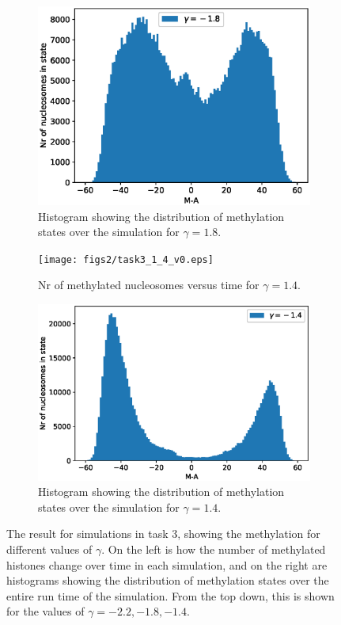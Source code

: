 \documentclass[fleqn,10pt]{SelfArx} %
\begin{document}
\begin{figure}[ht!]
\begin{subfigure}[b]{.49\textwidth}
		\includegraphics[width= \linewidth]{figs2/task3_hist_1_8_v0.eps}
		\caption{Histogram showing the distribution of methylation states over the simulation for $\gamma=1.8$.}
		\label{fig:task3_hist_1_8}
	\end{subfigure}
	\begin{subfigure}[b]{.49\textwidth}
		\centering
		\texttt{[image: figs2/task3\_1\_4\_v0.eps]}
		\caption{Nr of methylated nucleosomes versus time for $\gamma=1.4$.}
		\label{fig:task3_m_vs_t_1_4}
	\end{subfigure}
	\begin{subfigure}[b]{.49\textwidth}
		\centering
		\includegraphics[width= \linewidth]{figs2/task3_hist_1_4_v0.eps}
		\caption{Histogram showing the distribution of methylation states over the simulation for $\gamma=1.4$.}
		\label{fig:task3_hist_1_4}
	\end{subfigure}
		\caption{The result for simulations in task 3, showing the methylation for different values of $\gamma$. On the left is how the number of methylated histones change over time in each simulation, and on the right are histograms showing the distribution of methylation states over the entire run time of the simulation. From the top down, this is shown for the values of $\gamma = {-2.2, -1.8, -1.4}$.}
		\label{fig:task3}
\end{figure}
\end{document}
